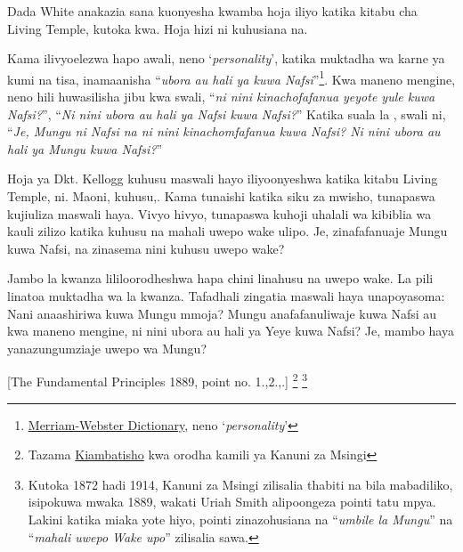 Dada White anakazia sana kuonyesha kwamba hoja iliyo katika kitabu cha Living Temple, kutoka kwa. Hoja hizi ni kuhusiana na.

Kama ilivyoelezwa hapo awali, neno ‘\textit{personality}’, katika muktadha wa karne ya kumi na tisa, inamaanisha “\textit{ubora au hali ya kuwa Nafsi}”\footnote{\href{https://www.merriam-webster.com/dictionary/personality}{Merriam-Webster Dictionary}, neno ‘\textit{personality}’}. Kwa maneno mengine, neno hili huwasilisha jibu kwa swali, “\textit{ni nini kinachofafanua yeyote yule kuwa Nafsi?}”, “\textit{Ni nini ubora au hali ya Nafsi kuwa Nafsi?}” Katika suala la , swali ni, “\textit{Je, Mungu ni Nafsi na ni nini kinachomfafanua kuwa Nafsi? Ni nini ubora au hali ya Mungu kuwa Nafsi?}”

Hoja ya Dkt. Kellogg kuhusu maswali hayo iliyoonyeshwa katika kitabu Living Temple, ni. Maoni, kuhusu,. Kama tunaishi katika siku za mwisho, tunapaswa kujiuliza maswali haya. Vivyo hivyo, tunapaswa kuhoji uhalali wa kibiblia wa kauli zilizo katika  kuhusu  na mahali uwepo wake ulipo. Je,  zinafafanuaje Mungu kuwa Nafsi, na zinasema nini kuhusu uwepo wake?

Jambo la kwanza lililoorodheshwa hapa chini linahusu  na uwepo wake. La pili linatoa muktadha wa la kwanza. Tafadhali zingatia maswali haya unapoyasoma: Nani anaashiriwa kuwa Mungu mmoja? Mungu anafafanuliwaje kuwa Nafsi au kwa maneno mengine, ni nini ubora au hali ya Yeye kuwa Nafsi? Je, mambo haya yanazungumziaje uwepo wa Mungu?


[The Fundamental Principles 1889, point no. 1.,2.,.] \footnote{Tazama \hyperref[chap:appendix]{Kiambatisho} kwa orodha kamili ya Kanuni za Msingi} \footnote{Kutoka 1872 hadi 1914, Kanuni za Msingi zilisalia thabiti na bila mabadiliko, isipokuwa mwaka 1889, wakati Uriah Smith alipoongeza pointi tatu mpya. Lakini katika miaka yote hiyo, pointi zinazohusiana na “\textit{umbile la Mungu}” na “\textit{mahali uwepo Wake upo}” zilisalia sawa.}

